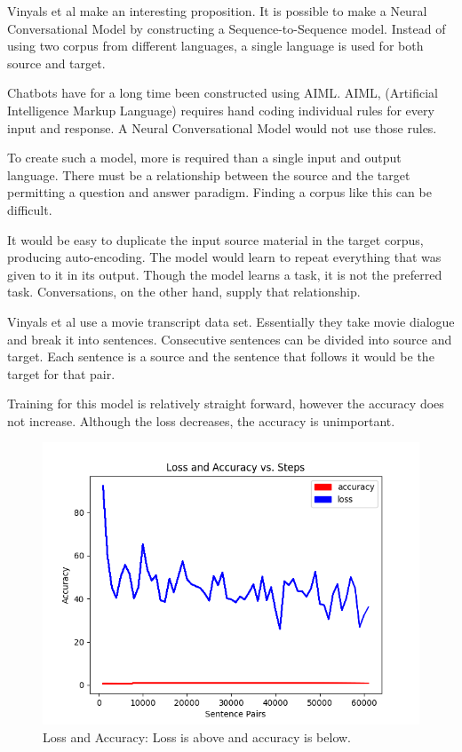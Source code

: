 Vinyals et al \cite{DBLP:journals/corr/VinyalsL15} make an interesting proposition. It is possible to make a Neural Conversational Model by constructing a Sequence-to-Sequence model. Instead of using two corpus from different languages, a single language is used for both source and target.

Chatbots have for a long time been constructed using \ac{AIML}. AIML, (Artificial Intelligence Markup Language) requires hand coding individual rules for every input and response. A Neural Conversational Model would not use those rules.

To create such a model, more is required than a single input and output language. There must be a relationship between the source and the target permitting a question and answer paradigm. Finding a corpus like this can be difficult.

It would be easy to duplicate the input source material in the target corpus, producing auto-encoding. The model would learn to repeat everything that was given to it in its output. Though the model learns a task, it is not the preferred task. Conversations, on the other hand, supply that relationship. 

Vinyals et al \cite{DBLP:journals/corr/VinyalsL15} use a movie transcript data set. Essentially they take movie dialogue and break it into sentences. Consecutive sentences can be divided into source and target. Each sentence is a source and the sentence that follows it would be the target for that pair. 

Training for this model is relatively straight forward, however the accuracy does not increase. Although the loss decreases, the accuracy is unimportant. %

\begin{figure}[H]
	\begin{center}
	
	\includegraphics[scale=0.5]{Figure_1}
		
\end{center}
	\caption[Loss and Accuracy]{Loss and Accuracy: Loss is above and accuracy is below.}
	

\end{figure}

